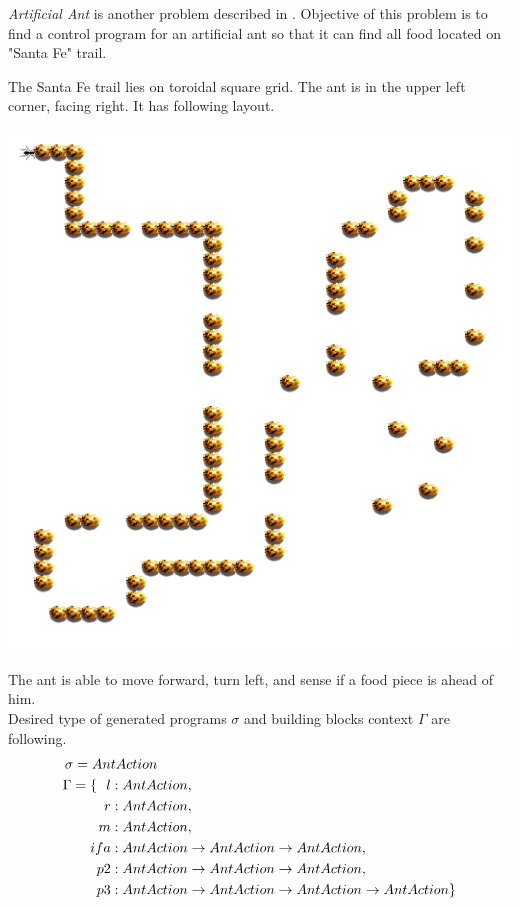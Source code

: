 \documentclass[12pt,a4paper]{report}
\begin{document}
\textit{Artificial Ant} is another problem described
in \cite{koza92}. Objective of this problem is to 
find a control program for an artificial ant so
that it can find all food located on "Santa Fe" trail.

The Santa Fe trail lies on toroidal square grid.
The ant is in the upper left corner, facing right.
It has following layout.

\includegraphics[scale=1]{santafe.png}



The ant is able to move forward, turn left, and sense if a food 
piece is ahead of him.\\

Desired type of generated programs $\sigma$ and 
building blocks context $\Gamma$ are following.
\begin{align*}
\sigma = An&tAction\\
\Gamma = \{~~
  l    &: AntAction                              ,\\
  r    &: AntAction                              ,\\
  m    &: AntAction                              ,\\
  ifa  &: AntAction \rightarrow AntAction \rightarrow AntAction  ,\\
  p2   &: AntAction \rightarrow AntAction \rightarrow AntAction  ,\\
  p3   &: AntAction \rightarrow AntAction \rightarrow AntAction \rightarrow AntAction  \}
\end{align*}
\end{document}
